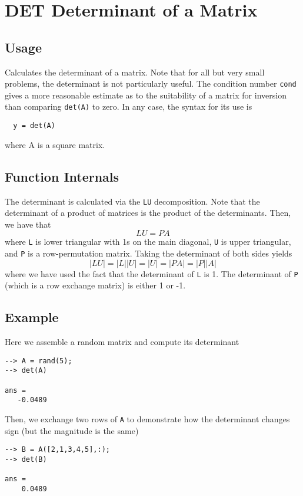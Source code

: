 \section{DET Determinant of a Matrix}

\subsection{Usage}

Calculates the determinant of a matrix.  Note that for all but
very small problems, the determinant is not particularly useful.
The condition number \verb|cond| gives a more reasonable estimate as
to the suitability of a matrix for inversion than comparing \verb|det(A)|
to zero.  In any case, the syntax for its use is
\begin{verbatim}
  y = det(A)
\end{verbatim}
where A is a square matrix.
\subsection{Function Internals}

The determinant is calculated via the \verb|LU| decomposition.  Note that
the determinant of a product of matrices is the product of the 
determinants.  Then, we have that 
\[
  L U = P A
\]
where \verb|L| is lower triangular with 1s on the main diagonal, \verb|U| is
upper triangular, and \verb|P| is a row-permutation matrix.  Taking the
determinant of both sides yields
\[
 |L U| = |L| |U| = |U| = |P A| = |P| |A|
\]
where we have used the fact that the determinant of \verb|L| is 1.  The
determinant of \verb|P| (which is a row exchange matrix) is either 1 or 
-1.
\subsection{Example}

Here we assemble a random matrix and compute its determinant
\begin{verbatim}
--> A = rand(5);
--> det(A)

ans = 
   -0.0489 
\end{verbatim}
Then, we exchange two rows of \verb|A| to demonstrate how the determinant
changes sign (but the magnitude is the same)
\begin{verbatim}
--> B = A([2,1,3,4,5],:);
--> det(B)

ans = 
    0.0489 
\end{verbatim}

